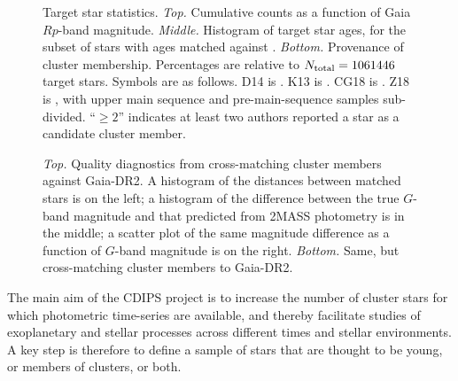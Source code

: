 \documentclass[12pt,twocolumn,tighten]{aastex62}
\begin{document}
\begin{figure}[!t]
	\begin{center}
		\leavevmode
		\vspace{-0.8cm}
		\vspace{-0.8cm}
	\end{center}
	\vspace{-0.8cm}
	\caption{
		Target star statistics.
		{\it Top.} Cumulative counts as a function of Gaia $Rp$-band
		magnitude.  
		{\it Middle.} Histogram of target star ages, for the subset of
		stars with ages matched against \citet{Kharchenko_et_al_2013}.
		{\it Bottom.} Provenance of cluster membership.  Percentages are
		relative to $N_{\rm total}=1061446$ target stars. Symbols
		are as follows.
		D14 is \citet{dias_proper_2014}.
		K13 is \citet{Kharchenko_et_al_2013}.
		CG18 is \citet{cantat-gaudin_gaia_2018}.
		Z18 is \citet{zari_3d_2018}, with upper main sequence and
		pre-main-sequence samples sub-divided.
		``$\geq 2$'' indicates at least two authors reported a star as a
		candidate cluster member.
		\label{fig:cdips_targets}
	}
\end{figure}

\begin{figure}[!t]
	\vspace{-1.1cm}
	\vspace{-0.8cm}
	\caption{
		{\it Top.} Quality diagnostics from cross-matching
		\cite{Kharchenko_et_al_2013} cluster members against Gaia-DR2.
		A histogram of the distances between matched stars is on the left; a
		histogram of the difference between the true $G$-band magnitude
		and that predicted from 2MASS photometry is in the middle; a scatter
		plot of the same magnitude difference as a function of $G$-band
		magnitude is on the right.
		{\it Bottom.} Same, but cross-matching \cite{dias_proper_2014}
		cluster members to Gaia-DR2.
	}
	\label{fig:xmatch_info}
\end{figure}

The main aim of the CDIPS project is to increase the number of cluster
stars for which photometric time-series are available, and thereby
facilitate studies of exoplanetary and stellar processes across
different times and stellar environments.  A key step is
therefore to define a sample of stars that are thought to be young, or
members of clusters, or both.
\end{document}
